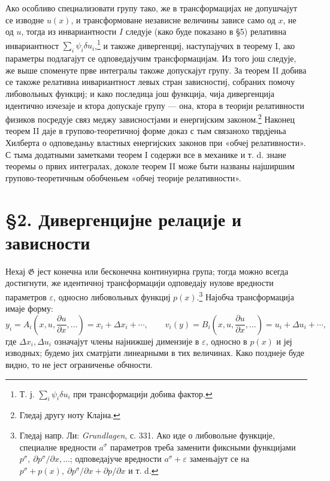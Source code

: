 ﻿\documentclass[11pt]{article}
\providecommand{\G}{\mathfrak G}
\providecommand{\eps}{\varepsilon}
\providecommand{\D}{\Delta}
\providecommand{\p}{\partial}
\begin{document}
Ако особливо специализовати групу тако, же в трансформацијах не допушчајут се изводне \(u(x)\), и трансформоване независне величины зависе само од \(x\), не од \(u\), тогда из инвариантности \(I\) следује (како буде показано в \S{}5) релативна инвариантност \(\sum_i\psi_i\delta u_i\),\footnote{Т. ј. \(\sum_i\psi_i\delta u_i\) при трансформацији добива фактор.} и такоже дивергенциј, наступајучих в теорему I, ако параметры подлагајут се одповедајучим трансформацијам. Из того још следује, же выше споменуте прве интегралы такоже допускајут групу. За теорем II добива се такоже релативна инвариантност левых стран зависностиј, собраних помочу либовольных функциј; и како последица још функција, чија дивергенција идентично изчезаје и ктора допускаје групу --- она, ктора в теорији релативности физиков посредује связ меджу зависностјами и енергијским законом.\footnote{Гледај другу ноту Клајна.} Наконец теорем II даје в групово-теоретичној форме доказ с тым связанохо тврдјеньа Хилберта о одповеданьу властных енергијских законов при «обчеј релативности». С тыма додатными заметками теорем I содержи все в механике и т. d. знане теоремы о првих интегралах, доколе теорем II може быти названы најширшим групово-теоретичным обобченьем «обчеј теорије релативности».

\section*{\S{}2. Дивергенцијне релације и зависности}

Нехај \(\G\) јест конечна или бесконечна континуирна група; тогда можно всегда достигнути, же идентичној трансформацији одповедају нулове вредности параметров \(\eps\), односно либовольных функциј \(p(x)\).\footnote{Гледај напр. Ли: \emph{Grundlagen}, с. 331. Ако иде о либовольне функције, специалне вредности \(a^\sigma\) параметров треба заменити фиксными функцијами \(p^\sigma,\ \p p^\sigma/\p x,\ldots\); одповедајуче вредности \(a^\sigma+\eps\) заменьајут се на \(p^\sigma+p(x),\ \p p^\sigma/\p x+\p p/\p x\) и т. d.} Најобча трансформација имаје форму:
\[
y_i=A_i\!\left(x,u,\frac{\p u}{\p x},\ldots\right)=x_i+\D x_i+\cdots,\qquad
v_i(y)=B_i\!\left(x,u,\frac{\p u}{\p x},\ldots\right)=u_i+\D u_i+\cdots,
\]
где \(\D x_i,\D u_i\) означајут члены најнижшеј димензије в \(\eps\), односно в \(p(x)\) и јеј изводных; будемо јих сматрјати линеарными в тих величинах. Како позднеје буде видно, то не јест ограниченье обчности.
\end{document}

